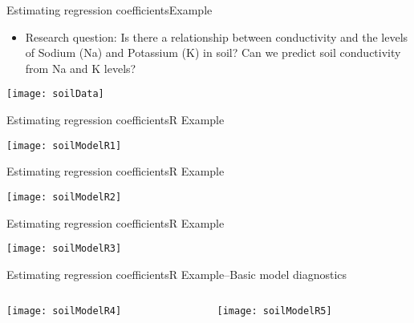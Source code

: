 \documentclass[xcolor=dvipsnames]{beamer}
\begin{document}
\begin{frame}{Estimating regression coefficients}{Example}
	\begin{itemize}
		\item Research question: Is there a relationship between conductivity and the levels of Sodium (Na) and Potassium (K) in soil? Can we predict soil conductivity from Na and K levels? \pause
	\end{itemize}
	\begin{center}
		\texttt{[image: soilData]}
	\end{center}
\end{frame}

\begin{frame}{Estimating regression coefficients}{R Example}
	\begin{center}
		\texttt{[image: soilModelR1]}
	\end{center}
\end{frame}

\begin{frame}{Estimating regression coefficients}{R Example}
	\begin{center}
		\texttt{[image: soilModelR2]}
	\end{center}
\end{frame}

\begin{frame}{Estimating regression coefficients}{R Example}
	\begin{center}
		\texttt{[image: soilModelR3]}
	\end{center}
\end{frame}

\begin{frame}{Estimating regression coefficients}{R Example--Basic model diagnostics}
	\begin{columns}
		\begin{column}{.35\textwidth}
			\begin{center}
				\texttt{[image: soilModelR4]}
			\end{center}
		\end{column}

		\begin{column}{.65\textwidth}
			\begin{center}
					\vspace{-6mm}
				\texttt{[image: soilModelR5]}
			\end{center}
		\end{column}
	\end{columns}
\end{frame}
\end{document}

